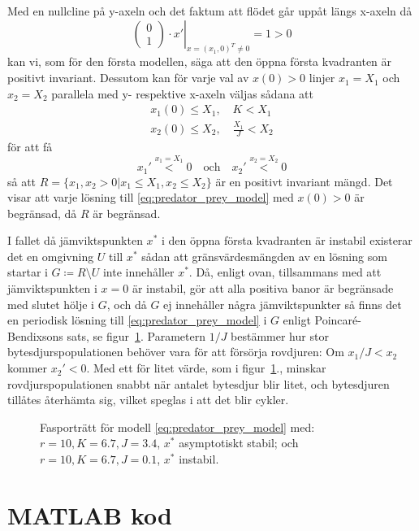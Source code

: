 \documentclass{article}
\newcommand\figurescale{1}
\begin{document}
Med en nullcline på y\nobreakdash-axeln och det faktum att
flödet går uppåt längs x\nobreakdash-axeln då
$$ \left. \begin{pmatrix} 0 \\ 1 \end{pmatrix} \cdot x' \right\vert_{x = (x_1, 0)^T \ne 0} = 1 > 0 $$
kan vi, som för den första modellen, säga att
den öppna första kvadranten är positivt invariant.
Dessutom kan för varje val av $x(0)>0$ linjer $x_1=X_1$ och $x_2=X_2$
parallela med y- respektive x\nobreakdash-axeln väljas
sådana att
\begin{gather*}
	x_1(0) \le X_1, \quad K < X_1 \\
	x_2(0) \le X_2, \quad  \frac{X_1}J < X_2
\end{gather*}
för att få
$$ x_1' \overset{x_1 = X_1}< 0 \quad \text{och} \quad x_2' \overset{x_2 = X_2}< 0 $$
så att $R = \{x_1, x_2 > 0 \vert x_1 \le X_1, x_2 \le X_2\}$
är en positivt invariant mängd.
Det visar att varje lösning till \eqref{eq:predator_prey_model} med
$x(0)>0$ är begränsad, då $R$ är begränsad.

I fallet då jämviktspunkten $x^*$ i den öppna första kvadranten
är instabil existerar det en omgivning $U$ till $x^*$ sådan att
gränsvärdesmängden av en lösning som startar i $G \coloneqq R \setminus U$
inte innehåller $x^*$.
Då, enligt ovan, tillsammans med att jämviktspunkten i $x=0$ är instabil,
gör att alla positiva banor är begränsade med slutet hölje i $G$,
och då $G$ ej innehåller några jämviktspunkter
så finns det en periodisk lösning till \eqref{eq:predator_prey_model}
i $G$ enligt Poincaré-Bendixsons sats,
se figur~\ref{fig:phase_portrait2}.
Parametern $1/J$ bestämmer hur stor bytesdjurspopulationen behöver
vara för att försörja rovdjuren: Om $x_1/J < x_2$ kommer $x_2' < 0$.
Med ett för litet värde, som i figur~\ref{fig:phase_portrait2}.,
minskar rovdjurspopulationen snabbt när antalet bytesdjur blir litet,
och bytesdjuren tillåtes återhämta sig,
vilket speglas i att det blir cykler.

\begin{figure}
	\centering
	\renewcommand{\figurescale}{0.2}
	\subfloat[]{ \label{fig:mod2_astable}}
	\subfloat[]{ \label{fig:mod2_unstable}}
	\caption{Fasporträtt för modell \eqref{eq:predator_prey_model} med:
	\protect{} $r=10, K=6.7, J=3.4$, $x^*$ asymptotiskt stabil; och
	\protect{} $r=10, K=6.7, J=0.1$, $x^*$ instabil. \label{fig:phase_portrait2}}
\end{figure}

\appendix
\section{MATLAB kod}


\printbibliography
\end{document}
